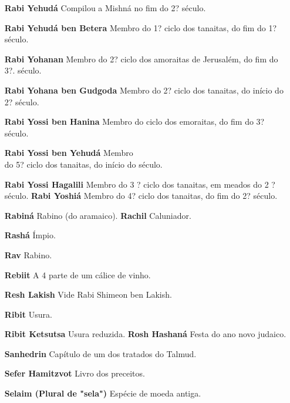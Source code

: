 \begin{itemize}
\begin{enumrate}
\begin{itemize}
\begin{itemize}
\begin{itemize}
\begin{itemize}
\begin{itemize}
\item[\textbf{Rabi Yehudá}] Compilou a Mishná no fim do 2? século.

\item[\textbf{Rabi Yehudá ben Betera}] Membro do 1? ciclo dos tanaitas, do
fim do 1? século.

\item[\textbf{Rabi Yohanan}] Membro do 2? ciclo dos amoraitas de Jerusalém,
do fim do 3?. século.

\item[\textbf{Rabi Yohana ben Gudgoda}] Mem­bro do 2? ciclo dos tanaitas, do
início do 2? século.

\item[\textbf{Rabi Yossi ben Hanina}] Membro do
ciclo dos emoraitas, do fim do 3? século.

\item[\textbf{Rabi Yossi ben Yehudá}] Membro\\
do 5? ciclo dos tanaitas, do início do
século.

\item[\textbf{Rabi Yossi Hagalili}] Membro do 3 ? ci­clo dos tanaitas, em
meados do 2 ? século. \textbf{Rabi Yoshiá} Membro do 4? ciclo dos
tanaitas, do fim do 2? século.

\item[\textbf{Rabiná} Rabino (do aramaico). \textbf{Rachil}] Caluniador.

\item[\textbf{Rashá}] Ímpio.

\item[\textbf{Rav}] Rabino.

\item[\textbf{Rebiit}] A 4 parte de um cálice de vinho.

\item[\textbf{Resh Lakish}] Vide Rabi Shimeon ben Lakish.

\item[\textbf{Ribit}] Usura.

\item[\textbf{Ribit Ketsutsa} Usura reduzida. \textbf{Rosh Hashaná}] Festa
do ano novo ju­daico.

\item[\textbf{Sanhedrin}] Capítulo de um dos tra­tados do Talmud.

\item[\textbf{Sefer Hamitzvot}] Livro dos precei­tos.

\item[\textbf{Selaim (Plural de "sela")}] Espécie de moeda antiga.


\end{itemize}
\end{itemize}
\end{itemize}
\end{itemize}
\end{itemize}
\end{enumrate}
\end{itemize}
